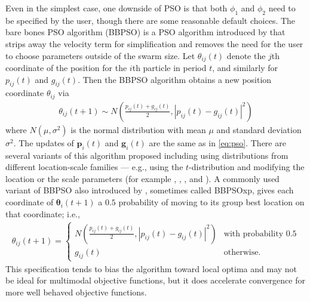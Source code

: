 \documentclass[12pt]{article}
\begin{document}
Even in the simplest case, one downside of PSO is that both $\phi_1$ and $\phi_2$ need to be specified by the user, though there are some reasonable default choices. The bare bones PSO algorithm (BBPSO) is a PSO algorithm introduced by \citet{kennedy2003bare} that strips away the velocity term for simplification and removes the need for the user to choose parameters outside of the swarm size. Let $\theta_{ij}(t)$ denote the $j$th coordinate of the position for the $i$th particle in period $t$, and similarly for $p_{ij}(t)$ and $g_{ij}(t)$. Then the BBPSO algorithm obtains a new position coordinate $\theta_{ij}$ via
\begin{align}\label{eq:bbpso}
\theta_{ij}(t+1) \sim N\left(\frac{p_{ij}(t) + g_{ij}(t)}{2}, |p_{ij}(t) - g_{ij}(t)|^2\right)
\end{align}
where $N(\mu,\sigma^2)$ is the normal distribution with mean $\mu$ and standard deviation $\sigma^2$. The updates of $\bm{p}_i(t)$ and $\bm{g}_i(t)$ are the same as in \eqref{eq:pso}. There are several variants of this algorithm proposed including using distributions from different location-scale families --- e.g., using the $t$-distribution and modifying the location or the scale parameters (for example \citet{krohling2009bare}, \citet{hsieh2010modified}, \citet{richer2006levy}, and \citet{campos2014bare}). A commonly used variant of BBPSO also introduced by \citet{kennedy2003bare}, sometimes called BBPSOxp, gives each coordinate of $\bm{\theta}_i(t+1)$ a $0.5$ probability of moving to its group best location on that coordinate; i.e.,
\begin{align*}
\theta_{ij}(t+1) = \begin{cases} N\left(\frac{p_{ij}(t) + g_{ij}(t)}{2}, |p_{ij}(t) - g_{ij}(t)|^2\right) & \mbox{with probability }0.5\\
g_{ij}(t) &\mbox{otherwise}.\end{cases}
\end{align*}
This specification tends to bias the algorithm toward local optima and may not be ideal for multimodal objective functions, but it does accelerate convergence for more well behaved objective functions. 
\end{document}
